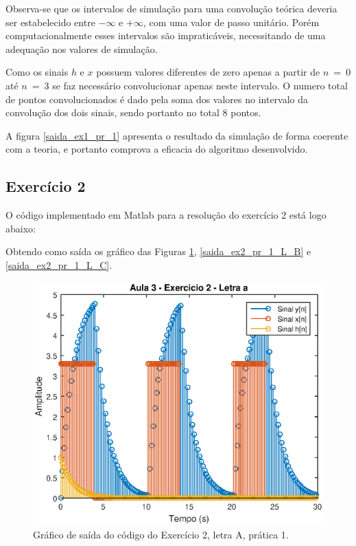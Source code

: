 Observa-se que os intervalos de simulação para uma convolução teórica deveria ser estabelecido entre $- \infty$ e $+ \infty$, com uma valor de passo unitário. Porém computacionalmente esses intervalos são impraticáveis, necessitando de uma adequação nos valores de simulação.

Como os sinais $h$ e $x$  possuem valores diferentes de zero apenas a partir de $n~=~0$ até $n~=~3$ se faz necessário convolucionar apenas neste intervalo. O numero total de pontos convolucionados é dado pela soma dos valores no intervalo da convolução dos dois sinais, sendo portanto no total 8 pontos.  

A figura \ref{saida_ex1_pr_1} apresenta o resultado da simulação de forma coerente com a teoria, e portanto comprova a eficacia do algoritmo desenvolvido. 

\subsection{Exercício 2}
O código implementado em Matlab para a resolução do exercício 2 está logo abaixo:


Obtendo como saída os gráfico das Figuras \ref{saida_ex2_pr_1_L_A}, \ref{saida_ex2_pr_1_L_B} e \ref{saida_ex2_pr_1_L_C}. 

\begin{figure}[!ht]
	\centering
    \includegraphics[scale = 1]{Imagens/Aula_3_exercicio2_LetraA.eps}
    \caption{Gráfico de saída do código do Exercício 2, letra A, prática 1.}
    \label{saida_ex2_pr_1_L_A}
\end{figure}

